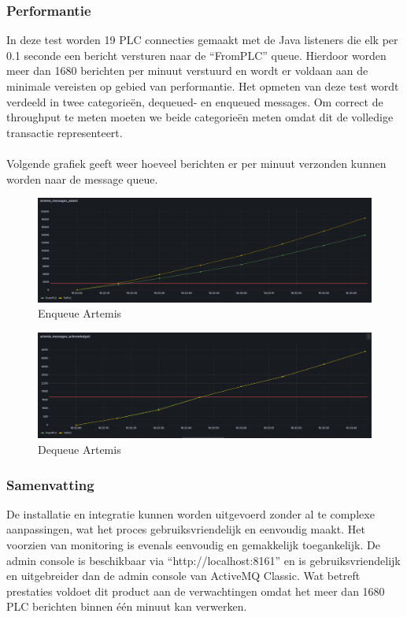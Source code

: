 \subsubsection{Performantie}
In deze test worden 19 PLC connecties gemaakt met de Java listeners die elk per 0.1 seconde een bericht versturen naar de ``FromPLC'' queue.
Hierdoor worden meer dan 1680 berichten per minuut verstuurd en wordt er voldaan aan de minimale vereisten op gebied van performantie.
Het opmeten van deze test wordt verdeeld in twee categorieën, dequeued- en enqueued messages.
Om correct de throughput te meten moeten we beide categorieën meten omdat dit de volledige transactie representeert. 
\\\\
Volgende grafiek geeft weer hoeveel berichten er per minuut verzonden kunnen worden naar de message queue.
\begin{figure}[h!]
  \centering
  \includegraphics[width=.95\textwidth]{img/artemis-enqueue-count.png}
  \caption{\label{fig:artemis_enqueue_count}Enqueue Artemis}
\end{figure}

\begin{figure}[h!]
  \centering
  \includegraphics[width=.95\textwidth]{img/artemis-dequeue-count.png}
  \caption{\label{fig:artemis_dequeue_count}Dequeue Artemis}
\end{figure}

\subsubsection{Samenvatting}
De installatie en integratie kunnen worden uitgevoerd zonder al te complexe aanpassingen, 
wat het proces gebruiksvriendelijk en eenvoudig maakt.
Het voorzien van monitoring is evenals eenvoudig en gemakkelijk toegankelijk. 
De admin console is beschikbaar via ``http://localhost:8161'' en is gebruiksvriendelijk en uitgebreider dan de admin console van ActiveMQ Classic.
Wat betreft prestaties voldoet dit product aan de verwachtingen omdat het meer dan 1680 PLC berichten binnen één minuut kan verwerken.